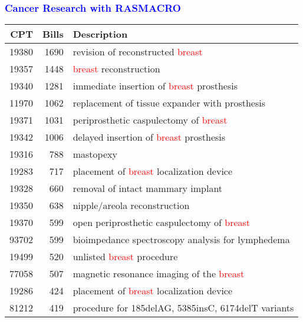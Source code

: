 \documentclass[11pt,pdftex,dvipsnames,usenames]{beamer}
\begin{document}
\begin{frame}[fragile]\frametitle{\bf\textcolor{blue}{Cancer Research with RASMACRO}}

\begin{center}
\begin{tabular}{rr|l}
CPT & Bills & Description \\ \hline
19380 & 1690 & revision of reconstructed \textcolor{red}{breast} \\
19357 & 1448 & \textcolor{red}{breast} reconstruction \\
19340 & 1281 & immediate insertion of \textcolor{red}{breast} prosthesis \\
11970 & 1062 & replacement of tissue expander with prosthesis \\
19371 & 1031 & periprosthetic caspulectomy of \textcolor{red}{breast} \\
19342 & 1006 & delayed insertion of \textcolor{red}{breast} prosthesis \\
19316 & 788 & mastopexy \\
19283 & 717 & placement of \textcolor{red}{breast} localization device \\
19328 & 660 & removal of intact mammary implant \\
19350 & 638 & nipple/areola reconstruction \\
19370 & 599 & open periprosthetic caspulectomy of \textcolor{red}{breast} \\
93702 & 599 & bioimpedance spectroscopy analysis for lymphedema \\
19499 & 520 & unlisted \textcolor{red}{breast} procedure \\
77058 & 507 & magnetic resonance imaging of the \textcolor{red}{breast} \\
19286 & 424 & placement of \textcolor{red}{breast} localization device \\
81212 & 419 & procedure for 185delAG, 5385insC, 6174delT variants 
\end{tabular}
\end{center}

\end{frame}
\end{document}
